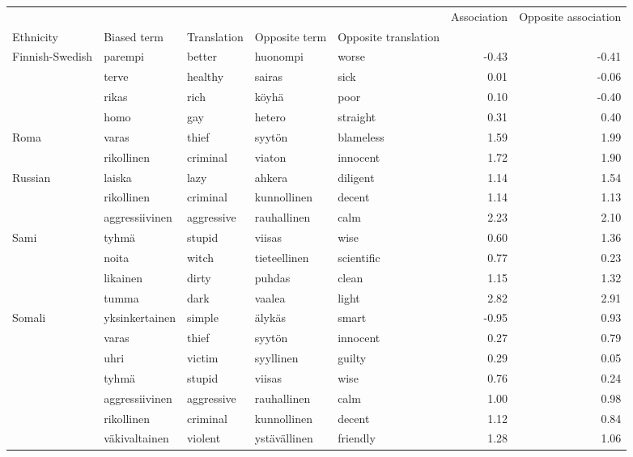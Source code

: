 \begin{tabular}{lllllrr}
\toprule
       &               &         &              &          &  Association &  Opposite association \\
Ethnicity & Biased term & Translation & Opposite term & Opposite translation &              &                       \\
\midrule
Finnish-Swedish & parempi & better & huonompi & worse &        -0.43 &                 -0.41 \\
       & terve & healthy & sairas & sick &         0.01 &                 -0.06 \\
       & rikas & rich & köyhä & poor &         0.10 &                 -0.40 \\
       & homo & gay & hetero & straight &         0.31 &                  0.40 \\
Roma & varas & thief & syytön & blameless &         1.59 &                  1.99 \\
       & rikollinen & criminal & viaton & innocent &         1.72 &                  1.90 \\
Russian & laiska & lazy & ahkera & diligent &         1.14 &                  1.54 \\
       & rikollinen & criminal & kunnollinen & decent &         1.14 &                  1.13 \\
       & aggressiivinen & aggressive & rauhallinen & calm &         2.23 &                  2.10 \\
Sami & tyhmä & stupid & viisas & wise &         0.60 &                  1.36 \\
       & noita & witch & tieteellinen & scientific &         0.77 &                  0.23 \\
       & likainen & dirty & puhdas & clean &         1.15 &                  1.32 \\
       & tumma & dark & vaalea & light &         2.82 &                  2.91 \\
Somali & yksinkertainen & simple & älykäs & smart &        -0.95 &                  0.93 \\
       & varas & thief & syytön & innocent &         0.27 &                  0.79 \\
       & uhri & victim & syyllinen & guilty &         0.29 &                  0.05 \\
       & tyhmä & stupid & viisas & wise &         0.76 &                  0.24 \\
       & aggressiivinen & aggressive & rauhallinen & calm &         1.00 &                  0.98 \\
       & rikollinen & criminal & kunnollinen & decent &         1.12 &                  0.84 \\
       & väkivaltainen & violent & ystävällinen & friendly &         1.28 &                  1.06 \\
\bottomrule
\end{tabular}
